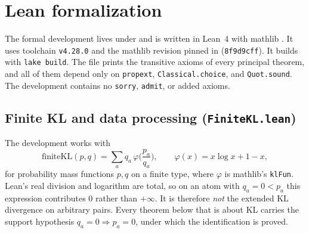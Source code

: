 \section{Lean formalization}\label{app:lean}

The formal development lives under  and is written in Lean~4 with mathlib \cite{demoura2015lean,mathlib2020}. It uses toolchain \texttt{v4.28.0} and the mathlib revision pinned in  (\texttt{8f9d9cff}). It builds with \texttt{lake build}. The file  prints the transitive axioms of every principal theorem, and all of them depend only on \texttt{propext}, \texttt{Classical.choice}, and \texttt{Quot.sound}. The development contains no \texttt{sorry}, \texttt{admit}, or added axioms.

\subsection{Finite KL and data processing (\texttt{FiniteKL.lean})}

The development works with
\[
\mathrm{finiteKL}(p,q)=\sum_aq_a\,\varphi\!\Big(\frac{p_a}{q_a}\Big),\qquad\varphi(x)=x\log x+1-x,
\]
for probability mass functions \(p,q\) on a finite type, where \(\varphi\) is mathlib's \texttt{klFun}. Lean's real division and logarithm are total, so on an atom with \(q_a=0<p_a\) this expression contributes \(0\) rather than \(+\infty\). It is therefore \emph{not} the extended KL divergence on arbitrary pairs. Every theorem below that is about KL carries the support hypothesis \(q_a=0\Rightarrow p_a=0\), under which the identification is proved.

